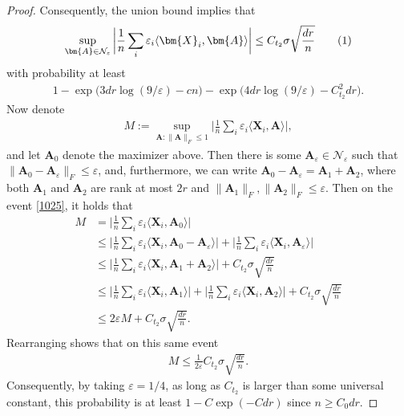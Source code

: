\documentclass[10pt]{article}
\newcommand\numberthis{\addtocounter{equation}{1}\tag{\theequation}}
\newcommand{\eps}{\ensuremath{\varepsilon}}
\theoremstyle{definition}
\begin{document}
\begin{proof}
Consequently, the union bound implies that
\begin{align}
    \sup_{\bm{A} \in \mathcal{N}_{\eps}}   \bigg| \frac{1}{n} \sum_{i} \eps_i \langle \bm{X}_i, \bm{A} \rangle \bigg| \leq C_{t_2} \sigma \sqrt{\frac{dr}{n}} \numberthis \label{1025}
\end{align}
with probability at least
\begin{align}
    1 - \exp \bigg( 3  d r \log( 9/\eps) - c n\bigg) - \exp\bigg( 4 dr \log(9/\eps) - C_{t_2}^2 dr \bigg). 
\end{align}
Now denote
 \begin{align}
     M := \sup_{\bm{A}: \| \bm{A} \|_F \leq 1 }  \bigg| \frac{1}{n} \sum_{i} \eps_i \langle \bm{X}_i, \bm{A} \rangle \bigg|,
 \end{align}
 and let $\bm{A}_0$ denote the maximizer above.  Then there is some $\bm{A}_{\eps} \in \mathcal{N}_{\eps}$ such that $\|\bm{A}_0 - \bm{A}_{\eps} \|_F \leq \eps$, and, furthermore, we can write $\bm{A}_0 - \bm{A}_{\eps} = \bm{A}_1 + \bm{A}_2$, where both $\bm{A}_1$ and $\bm{A}_2$ are rank at most $2r$ and $\|\bm{A}_1 \|_F, \|\bm{A}_2\|_F \leq \eps$.  Then on the event \eqref{1025}, it holds that
 \begin{align}
       M &= \bigg| \frac{1}{n} \sum_{i} \eps_i \langle \bm{X}_i, \bm{A}_0 \rangle \bigg| \\
       &\leq \bigg| \frac{1}{n} \sum_{i} \eps_i \langle \bm{X}_i, \bm{A}_0 - \bm{A}_\eps \rangle \bigg| + \bigg| \frac{1}{n} \sum_{i} \eps_i \langle \bm{X}_i,  \bm{A}_\eps \rangle \bigg| \\
       &\leq \bigg| \frac{1}{n} \sum_{i} \eps_i \langle \bm{X}_i, \bm{A}_1 + \bm{A}_2  \rangle \bigg| +  C_{t_2} \sigma \sqrt{\frac{dr}{n}} \\
       &\leq \bigg| \frac{1}{n} \sum_{i} \eps_i \langle \bm{X}_i, \bm{A}_1 \rangle \bigg| + \bigg| \frac{1}{n} \sum_{i} \eps_i \langle \bm{X}_i,\bm{A}_2  \rangle \bigg| +  C_{t_2} \sigma \sqrt{\frac{dr}{n}} \\
       &\leq 2 \eps M + C_{t_2} \sigma \sqrt{\frac{dr}{n}}.
 \end{align}
 Rearranging shows that on this same event
 \begin{align}
     M \leq \frac{1}{2\eps }C_{t_2} \sigma \sqrt{\frac{dr}{n}}.
 \end{align}
 Consequently, by taking $\eps = 1/4$, as long as $C_{t_2}$ is larger than some universal constant, this probability is at least $1 - C \exp( - C dr )$ since $n \geq C_0 dr$.   
\end{proof}
\end{document}
